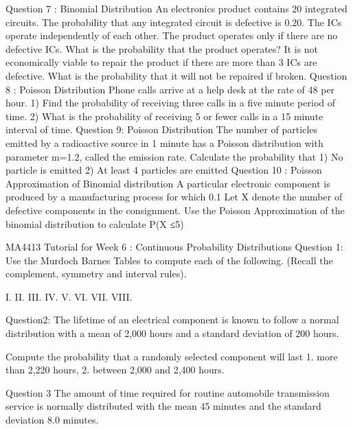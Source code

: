 Question 7 : Binomial Distribution
An electronics product contains 20 integrated circuits. The probability that any integrated circuit is defective is 0.20. The ICs operate independently of each other.  The product operates only if there are no defective ICs. What is the probability that the product operates?
It is not economically viable to repair the product if there are more than 3 ICs are defective.  What is the probability that it will not be repaired if broken.
Question 8 : Poisson Distribution
Phone calls arrive at a help desk at the rate of 48 per hour.
1)	Find the probability of receiving three calls in a five minute period of time.
2)	What is the probability of receiving 5 or fewer calls in a 15 minute interval of time.
Question 9: Poisson Distribution
The number of particles emitted by a radioactive source in 1 minute has a Poisson distribution with parameter m=1.2, called the emission rate. Calculate the probability that
1)	No particle is emitted
2)	At least 4 particles are emitted
Question 10 : Poisson Approximation of Binomial distribution
A particular electronic component is produced by a manufacturing process for which 0.1%
Let X denote the number of defective components in the consignment.
Use the Poisson Approximation of the binomial distribution to calculate P(X ≤5)










MA4413 Tutorial for Week 6 : Continuous Probability Distributions
Question 1:  Use the Murdoch Barnes Tables to compute each of the following. 
(Recall the complement, symmetry and interval rules).

 
I.	 
II.	 
III.	 
IV.	 
V.	 
VI.	 
VII.	 
VIII.	 
 

Question2:  The lifetime of an electrical component is known to follow a normal distribution with a mean of 2,000 hours and a standard deviation of 200 hours.  

Compute the probability that a randomly selected component will last 
1.	more than 2,220 hours, 
2.	between 2,000 and 2,400 hours. 

Question 3
The amount of time required for routine automobile transmission service is normally distributed with the mean 45 minutes and the standard deviation 8.0 minutes. 

